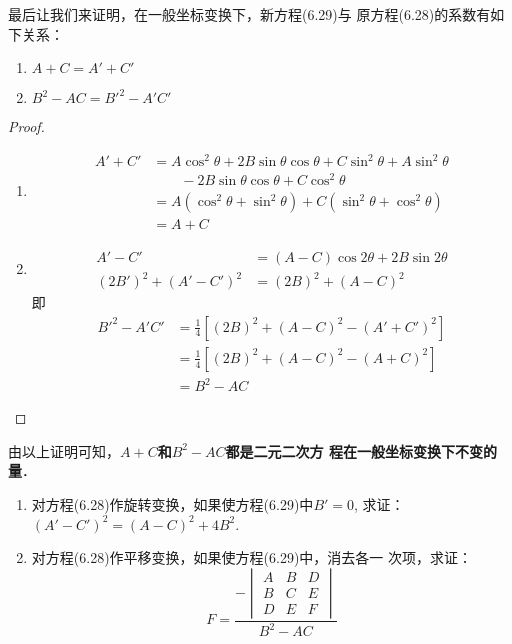 最后让我们来证明，在一般坐标变换下，新方程(6.29)与
原方程(6.28)的系数有如下关系：
\begin{enumerate}
    \item $A+C=A'+C'$
    \item $B^2-AC={B'}^2-A'C'$
\end{enumerate}

\begin{proof}
\begin{enumerate}
    \item \[\begin{split}
 A'+C'&=A\cos^2\theta +2B\sin\theta \cos\theta 
    +C \sin^2\theta +A\sin^2\theta
    \\
    &\qquad -2B\sin\theta \cos\theta +C\cos^2\theta\\
    &=A(\cos^2\theta+\sin^2\theta)+C(\sin^2\theta+\cos^2\theta)\\
    &=A+C       
    \end{split}\]
    \item \[\begin{split}
A'-C'&=(A-C)\cos2\theta+2B\sin2\theta \\
(2B')^2+(A'-C')^2&=(2B)^2+(A-C)^2        
    \end{split}\]
    即
\[\begin{split}
    {B'}^2-A'C'&=\frac{1}{4}\left[(2B)^2+(A-C)^2-(A'+C')^2\right]\\
    &=\frac{1}{4}\left[(2B)^2+(A-C)^2-(A+C)^2\right]\\
    &=B^2-AC
\end{split}\]
\end{enumerate}
\end{proof}

由以上证明可知，\textbf{$A+C$和$B^2-AC$都是二元二次方
程在一般坐标变换下不变的量}．

\begin{ex}
\begin{enumerate}
    \item 对方程(6.28)作旋转变换，如果使方程(6.29)中$B'=0$, 
    求证：$(A'-C')^2=(A-C)^2+4B^2$.
    \item 对方程(6.28)作平移变换，如果使方程(6.29)中，消去各一
    次项，求证：
\[F=\frac{-\begin{vmatrix}
    A&B&D\\B&C&E\\D&E&F
\end{vmatrix}}{B^2-AC}\]
\end{enumerate}
\end{ex}

